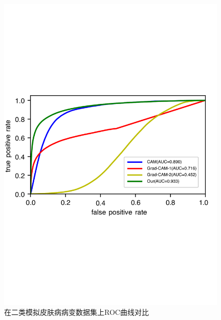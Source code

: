 \begin{figure}[H]
	\centering
	\includegraphics[width=0.98\textwidth]{figure/ROC_cam_grad_cam_our_simulated_skin_datasets}
	\caption{在二类模拟皮肤病病变数据集上ROC曲线对比}
	
	\label{fig:roc_cam_grad_cam_our_simulated_skin_datasets}
\end{figure}
\vspace{-1cm}
